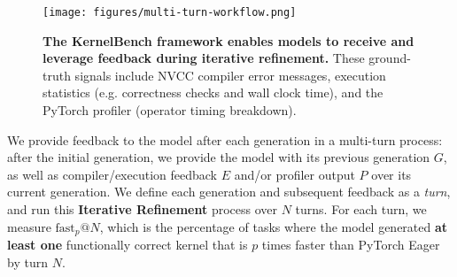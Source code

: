 \begin{figure}[H]
    \centering
    \vspace{-2mm}
    \texttt{[image: figures/multi-turn-workflow.png]}
    \caption{\textbf{The KernelBench framework enables models to receive and leverage feedback during iterative refinement.} These ground-truth signals include NVCC compiler error messages, execution statistics (e.g. correctness checks and wall clock time), and the PyTorch profiler (operator timing breakdown). }
    \vspace{-2mm}
    \label{fig:multi-turn-feedback}
\end{figure}
 
\noindent We provide feedback to the model after each generation in a multi-turn process: after the initial generation, we provide the model with its previous generation $G$, as well as compiler/execution feedback $E$ and/or profiler output $P$ over its current generation. We define each generation and subsequent feedback as a \textit{turn}, and run this \textbf{Iterative Refinement} process over $N$ turns. For each turn, we measure $\text{fast}_{p}@N$, which is the percentage of tasks where the model generated \textbf{at least one} functionally correct kernel that is $p$ times faster than PyTorch Eager by turn $N$.
\FloatBarrier  
